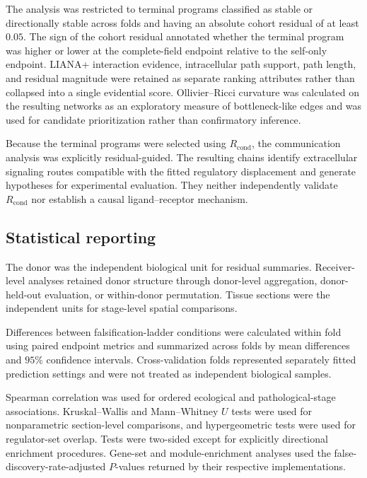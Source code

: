 The analysis was restricted to terminal programs classified as stable or
directionally stable across folds and having an absolute cohort residual of at
least \(0.05\). The sign of the cohort residual annotated whether the terminal
program was higher or lower at the complete-field endpoint relative to the
self-only endpoint. LIANA+ interaction evidence, intracellular path support,
path length, and residual magnitude were retained as separate ranking
attributes rather than collapsed into a single evidential score.
Ollivier--Ricci curvature \autocite{Ollivier2009-oq} was calculated on the
resulting networks as an exploratory measure of bottleneck-like edges and was
used for candidate prioritization rather than confirmatory inference.

Because the terminal programs were selected using
\(R_{\mathrm{cond}}\), the communication analysis was explicitly
residual-guided. The resulting chains identify extracellular signaling routes
compatible with the fitted regulatory displacement and generate hypotheses for
experimental evaluation. They neither independently validate
\(R_{\mathrm{cond}}\) nor establish a causal ligand--receptor mechanism.

\subsection{Statistical reporting}
\label{sec:methods-secondary-statistics}

The donor was the independent biological unit for residual summaries.
Receiver-level analyses retained donor structure through donor-level
aggregation, donor-held-out evaluation, or within-donor permutation. Tissue sections were the independent units for stage-level spatial comparisons.

Differences between falsification-ladder conditions were calculated within fold using paired endpoint metrics and summarized across folds by mean differences and \(95\%\) confidence intervals. Cross-validation folds represented separately fitted prediction settings and were not treated as independent biological samples.

Spearman correlation was used for ordered ecological and pathological-stage associations. Kruskal--Wallis and Mann--Whitney \(U\) tests were used for nonparametric section-level comparisons, and hypergeometric tests were used for regulator-set overlap. Tests were two-sided except for explicitly directional enrichment procedures. Gene-set and module-enrichment analyses used the false-discovery-rate-adjusted \(P\)-values returned by their respective
implementations.

